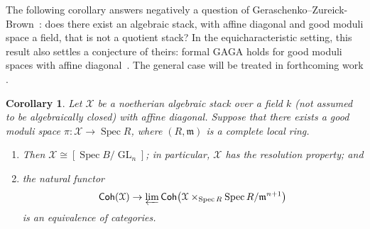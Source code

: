 \documentclass[a4paper]{amsart}
\theoremstyle{plain}
\newtheorem{corollary}[theorem]{Corollary}
\theoremstyle{definition}
\theoremstyle{remark}
\numberwithin{equation}{section}
\newcommand{\fm}{\mathfrak{m}}
\newcommand\cX{\mathcal{X}}
\newcommand\Coh{\mathsf{Coh}}
\DeclareMathOperator{\Spec}{Spec}
\DeclareMathOperator{\GL}{GL}
\newcommand{\ilim}{\varprojlim}
\begin{document}
The following corollary answers negatively a question of Geraschenko--Zureick-Brown~\cite[Qstn.\ 32]{geraschenko-brown}:  does there exist an algebraic stack, with affine diagonal and good moduli space a field, that is not a quotient stack?  In the equicharacteristic setting, this result also settles a conjecture of theirs: formal GAGA holds for good moduli spaces with affine diagonal~\cite[Conj.\ 28]{geraschenko-brown}. The general case will be treated in forthcoming work \cite{ahr2}.
\begin{corollary}\label{C:gb-c28}
Let $\cX$ be a noetherian algebraic stack over a field $k$ (not assumed to be algebraically closed) with affine diagonal. Suppose that there exists a good moduli space $\pi \colon \cX \to \Spec R$, where $(R,\fm)$ is a complete local ring.
\begin{enumerate}
\item \label{C:gb-c28:res} Then $\cX\cong[\Spec B/\GL_n]$; in particular, $\cX$  has the resolution property; and
\item \label{C:gb-c28:fGAGA} the natural functor
  \[
  \Coh(\cX) \to \ilim \Coh\bigl( \cX \times_{\Spec R} \Spec
  R/\fm^{n+1}\bigr)
  \]
  is an equivalence of categories.
\end{enumerate}
\end{corollary}
\end{document}
